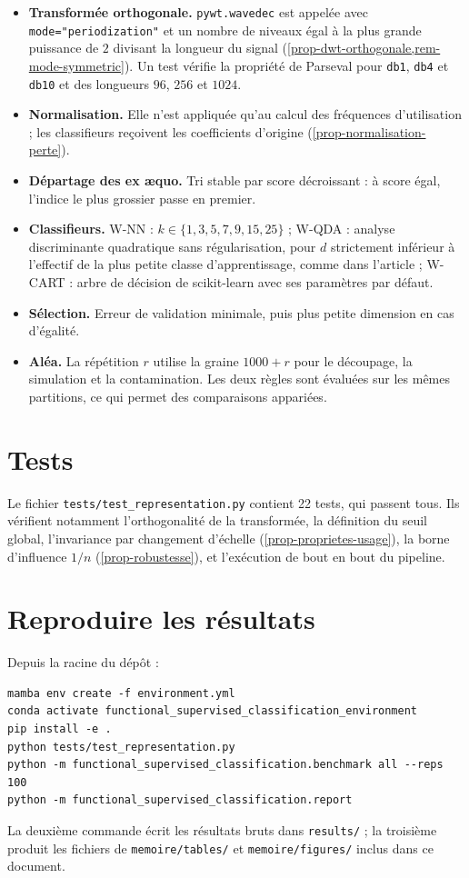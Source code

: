 \begin{itemize}
  \item \textbf{Transformée orthogonale.} \texttt{pywt.wavedec} est appelée avec \texttt{mode="periodization"} et un nombre de niveaux égal à la plus grande puissance de $2$ divisant la longueur du signal (\cref{prop-dwt-orthogonale,rem-mode-symmetric}). Un test vérifie la propriété de Parseval pour \texttt{db1}, \texttt{db4} et \texttt{db10} et des longueurs $96$, $256$ et $1024$.
  \item \textbf{Normalisation.} Elle n'est appliquée qu'au calcul des fréquences d'utilisation ; les classifieurs reçoivent les coefficients d'origine (\cref{prop-normalisation-perte}).
  \item \textbf{Départage des ex æquo.} Tri stable par score décroissant : à score égal, l'indice le plus grossier passe en premier.
  \item \textbf{Classifieurs.} W-NN : $k\in\{1,3,5,7,9,15,25\}$ ; W-QDA : analyse discriminante quadratique sans régularisation, pour $d$ strictement inférieur à l'effectif de la plus petite classe d'apprentissage, comme dans l'article ; W-CART : arbre de décision de scikit-learn avec ses paramètres par défaut.
  \item \textbf{Sélection.} Erreur de validation minimale, puis plus petite dimension en cas d'égalité.
  \item \textbf{Aléa.} La répétition $r$ utilise la graine $1000+r$ pour le découpage, la simulation et la contamination. Les deux règles sont évaluées sur les mêmes partitions, ce qui permet des comparaisons appariées.
\end{itemize}

\section{Tests}

Le fichier \texttt{tests/test\_representation.py} contient 22 tests, qui passent tous. Ils vérifient notamment l'orthogonalité de la transformée, la définition du seuil global, l'invariance par changement d'échelle (\cref{prop-proprietes-usage}), la borne d'influence $1/n$ (\cref{prop-robustesse}), et l'exécution de bout en bout du pipeline.

\section{Reproduire les résultats}

Depuis la racine du dépôt :
\begin{verbatim}
mamba env create -f environment.yml
conda activate functional_supervised_classification_environment
pip install -e .
python tests/test_representation.py
python -m functional_supervised_classification.benchmark all --reps 100
python -m functional_supervised_classification.report
\end{verbatim}
La deuxième commande écrit les résultats bruts dans \texttt{results/} ; la troisième produit les fichiers de \texttt{memoire/tables/} et \texttt{memoire/figures/} inclus dans ce document.
